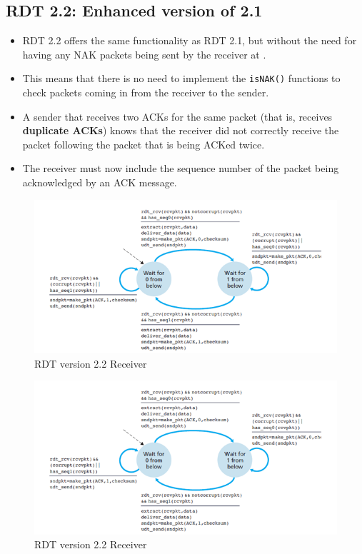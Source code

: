 \documentclass{article}
\theoremstyle{plain}
\theoremstyle{definition}
\begin{document}
\subsection{RDT 2.2: Enhanced version of 2.1}
\begin{itemize}
    \item RDT 2.2 offers the same functionality as RDT 2.1, but without the need for having any NAK packets being sent by the receiver at .
    
    \item  This means that there is no need to implement the \texttt{isNAK()} functions to check packets coming in from the receiver to the sender. 
    
    \item A sender that receives two ACKs for the same packet (that is, receives \textbf{duplicate ACKs}) knows that the receiver did not correctly receive the packet following the packet that is being ACKed twice.
    
    \item The receiver must now include the sequence number of the packet being acknowledged by an ACK message. 
\end{itemize}
\begin{figure}[!h]
    \centering
    \includegraphics[scale=0.8]{rdt22r.png}
    \caption{RDT version 2.2 Receiver}
    \label{fig:my_label_7}
\end{figure}
\begin{figure}[!h]
    \centering
    \includegraphics[scale=0.8]{rdt22r.png}
    \caption{RDT version 2.2 Receiver}
    \label{fig:my_label_8}
\end{figure}
\end{document}

